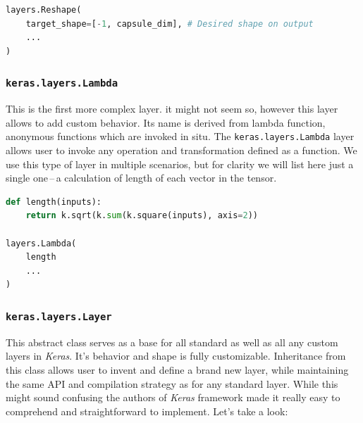 \begin{lstlisting}[language=Python, caption=Reshape layer]
layers.Reshape(
    target_shape=[-1, capsule_dim], # Desired shape on output
    ...
)
\end{lstlisting}

\subsubsection{\texttt{keras.layers.Lambda}}

This is the first more complex layer. it might not seem so, however this layer allows to add custom behavior. Its name is derived from lambda function, anonymous functions which are invoked in situ. The \texttt{keras.layers.Lambda} layer allows user to invoke any operation and transformation defined as a function. We use this type of layer in multiple scenarios, but for clarity we will list here just a single one\,--\,a calculation of length of each vector in the tensor.

\begin{lstlisting}[language=Python, caption=Lambda layer]
def length(inputs):
    return k.sqrt(k.sum(k.square(inputs), axis=2))

layers.Lambda(
    length
    ...
)
\end{lstlisting}


\subsubsection{\texttt{keras.layers.Layer}}

This abstract class serves as a base for all standard as well as all any custom layers in \textit{Keras}. It's behavior and shape is fully customizable. Inheritance from this class allows user to invent and define a brand new layer, while maintaining the same API and compilation strategy as for any standard layer. While this might sound confusing the authors of \textit{Keras} framework made it really easy to comprehend and straightforward to implement. Let's take a look:



